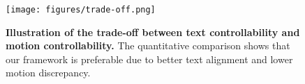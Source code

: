\begin{figure}[t]
  \centering
  \texttt{[image: figures/trade-off.png]}
  \caption{{\bf Illustration of the trade-off between text controllability and motion controllability.} The quantitative comparison shows that our framework is preferable due to better text alignment and lower motion discrepancy.}
  \label{fig:trade-off}
\end{figure}